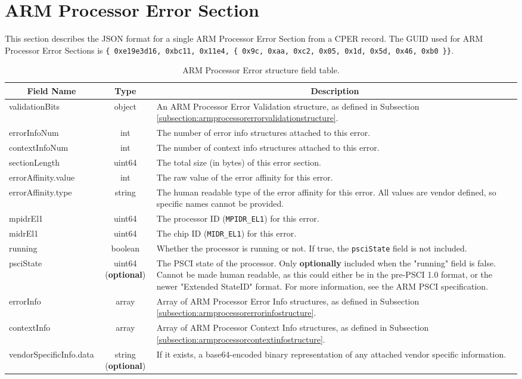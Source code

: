 \documentclass{report}
\newcommand*{\thead}[1]{\multicolumn{1}{|c|}{\bfseries #1}}
\newcommand*{\jsontable}[1]{
    \begin{table}[!ht]
    \label{#1}
    \centering
    \begin{adjustbox}{center}
    \begin{tabular}{|l|c|p{8cm}|}
    \hline
    \thead{Field Name} & \thead{Type} & \thead{Description} \\
    \hline
}
\newcommand*{\jsontableend}[1]{
    \hline
    \end{tabular}
    \end{adjustbox}
    \caption{#1}
    \label{table:#1}
    \end{table}
    \FloatBarrier
}
\begin{document}
\section{ARM Processor Error Section}
\label{section:armprocessorerrorsection}
This section describes the JSON format for a single ARM Processor Error Section from a CPER record. The GUID used for ARM Processor Error Sections is \texttt{\{ 0xe19e3d16, 0xbc11, 0x11e4, \{ 0x9c, 0xaa, 0xc2, 0x05, 0x1d, 0x5d, 0x46, 0xb0 \}\}}.
\jsontable{table:armprocessorerrorsection}
validationBits & object & An ARM Processor Error Validation structure, as defined in Subsection \ref{subsection:armprocessorerrorvalidationstructure}.\\
\hline
errorInfoNum & int & The number of error info structures attached to this error.\\
\hline
contextInfoNum & int & The number of context info structures attached to this error.\\
\hline
sectionLength & uint64 & The total size (in bytes) of this error section.\\
\hline
errorAffinity.value & int & The raw value of the error affinity for this error.\\
errorAffinity.type & string & The human readable type of the error affinity for this error. All values are vendor defined, so specific names cannot be provided.\\
\hline
mpidrEl1 & uint64 & The processor ID (\texttt{MPIDR\_EL1}) for this error.\\
\hline
midrEl1 & uint64 & The chip ID (\texttt{MIDR\_EL1}) for this error.\\
\hline
running & boolean & Whether the processor is running or not. If true, the \texttt{psciState} field is not included.\\
\hline
psciState & uint64 (\textbf{optional}) & The PSCI state of the processor. Only \textbf{optionally} included when the "running" field is false. Cannot be made human readable, as this could either be in the pre-PSCI 1.0 format, or the newer "Extended StateID" format. For more information, see the ARM PSCI specification.\\
\hline
errorInfo & array & Array of ARM Processor Error Info structures, as defined in Subsection \ref{subsection:armprocessorerrorinfostructure}.\\
\hline
contextInfo & array & Array of ARM Processor Context Info structures, as defined in Subsection \ref{subsection:armprocessorcontextinfostructure}.\\
\hline
vendorSpecificInfo.data & string (\textbf{optional}) & If it exists, a base64-encoded binary representation of any attached vendor specific information.\\
\jsontableend{ARM Processor Error structure field table.}
\end{document}
